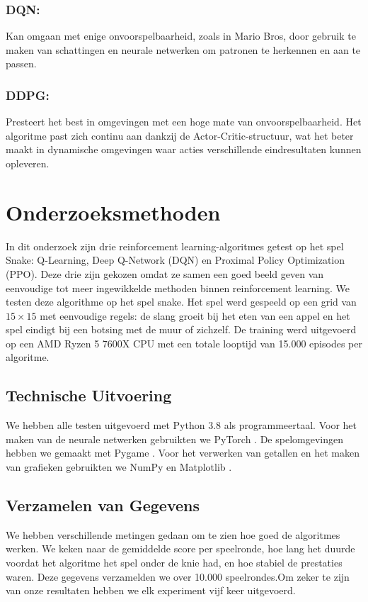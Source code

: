 \documentclass[a4paper,11pt]{report}
\begin{document}
\subsection*{DQN:}
Kan omgaan met enige onvoorspelbaarheid, zoals in Mario Bros, door gebruik te
maken van schattingen en neurale netwerken om patronen te herkennen en aan te
passen.

\subsection*{DDPG:}
Presteert het best in omgevingen met een hoge mate van onvoorspelbaarheid. Het
algoritme past zich continu aan dankzij de Actor-Critic-structuur, wat het
beter maakt in dynamische omgevingen waar acties verschillende eindresultaten
kunnen opleveren.

\chapter{Onderzoeksmethoden}
In dit onderzoek zijn drie reinforcement learning-algoritmes getest op het spel
Snake: Q-Learning, Deep Q-Network (DQN) en Proximal Policy Optimization (PPO).
Deze drie zijn gekozen omdat ze samen een goed beeld geven van eenvoudige tot
meer ingewikkelde methoden binnen reinforcement learning. We testen deze
algorithme op het spel snake. Het spel werd gespeeld op een grid van $15 \times
    15$ met eenvoudige regels: de slang groeit bij het eten van een appel en het
spel eindigt bij een botsing met de muur of zichzelf. De training werd
uitgevoerd op een AMD Ryzen 5 7600X CPU met een totale looptijd van 15.000
episodes per algoritme.

\section{Technische Uitvoering}
We hebben alle testen uitgevoerd met Python 3.8 \cite{python_docs} als
programmeertaal. Voor het maken van de neurale netwerken gebruikten we PyTorch
\cite{pytorch_docs}. De spelomgevingen hebben we gemaakt met Pygame
\cite{pygame}. Voor het verwerken van getallen en het maken van grafieken
gebruikten we NumPy \cite{numpy_docs} en Matplotlib \cite{matplotlib_docs}.

\section{Verzamelen van Gegevens}
We hebben verschillende metingen gedaan om te zien hoe goed de algoritmes
werken. We keken naar de gemiddelde score per speelronde, hoe lang het duurde
voordat het algoritme het spel onder de knie had, en hoe stabiel de prestaties
waren. Deze gegevens verzamelden we over 10.000 speelrondes.Om zeker te zijn
van onze resultaten hebben we elk experiment vijf keer uitgevoerd.
\end{document}
